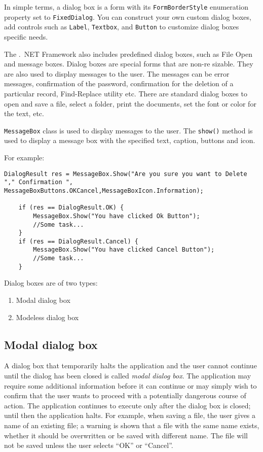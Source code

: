 In simple terms, a dialog box is a form with its \texttt{FormBorderStyle} enumeration property set to \texttt{FixedDialog}. You can
construct your own custom dialog boxes, add controls such as \texttt{Label}, \texttt{Textbox}, and \texttt{Button} to customize dialog boxes specific needs.

The .\ NET Framework also includes predefined dialog boxes, such as File Open and message
boxes. Dialog boxes are special forms that are non-re sizable. They are also used to display messages to the user. The messages can be error
messages, confirmation of the password, confirmation for the deletion of a particular record, Find-Replace utility etc. There are standard dialog boxes to open and save a file, select a folder, print the documents, set the font or color for the text, etc.

\texttt{MessageBox} class is used to display messages to the user. The \texttt{show()} method is used to display a message box with the specified text, caption, buttons and icon.

For example:
\begin{lstlisting}[numbers=none]
	DialogResult res = MessageBox.Show("Are you sure you want to Delete "," Confirmation ", MessageBoxButtons.OKCancel,MessageBoxIcon.Information);
	
	if (res == DialogResult.OK) {
		MessageBox.Show("You have clicked Ok Button");
		//Some task...
	}
	if (res == DialogResult.Cancel) {
		MessageBox.Show("You have clicked Cancel Button");
		//Some task...
	}	
\end{lstlisting}
Dialog boxes are of two types:
\begin{enumerate}
	\item Modal dialog box
	\item Modeless dialog box
\end{enumerate}

\subsection{Modal dialog box}
A dialog box that temporarily halts the application and the user cannot continue until the dialog has been closed is called \textit{modal dialog box}. The application may require some additional information
before it can continue or may simply wish to confirm that the user wants to proceed with a
potentially dangerous course of action. The application continues to execute only after the dialog
box is closed; until then the application halts. For example, when saving a file, the user gives a
name of an existing file; a warning is shown that a file with the same name exists, whether it should
be overwritten or be saved with different name. The file will not be saved unless the user selects
“OK” or “Cancel”.

